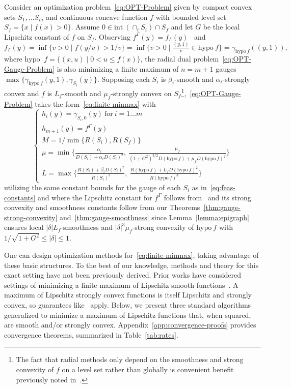 \documentclass[sn-mathphys,Numbered]{sn-jnl}%
\newcommand{\hypo}{\text{hypo }}
\begin{document}
Consider an optimization problem~\eqref{eq:OPT-Problem} given by compact convex sets $S_1,\dots S_m$ and continuous concave function $f$ with bounded level set $S_f = \{x \mid f(x)>0\}$. Assume $0\in \mathrm{int\ } (\cap_{i} S_i)\cap S_f$ and let $G$ be the local Lipschitz constant of $f$ on $S_f$. Observing $f^{\Gamma}(y)=f_{\Gamma}(y)$~\cite[Proposition 11]{grimmer2023radial1} and 
$f_{\Gamma}(y) =\inf\{v>0 \mid f(y/v)>1/v\}= \inf\{v>0 \mid \frac{(y,1)}{v}\in \mathrm{hypo\ }f\}=\gamma_{\mathrm{hypo\ }f}((y,1)),
$
where $\mathrm{\hypo\ }f = \{(x,u) \mid 0 < u\leq f(x)\}$, the radial dual problem~\eqref{eq:OPT-Gauge-Problem} is also minimizing a finite maximum of $n=m+1$ gauges $\max\{\gamma_{\mathrm{hypo\ }f}(y,1),\gamma_{S_i}(y)\}$. Supposing each $S_i$ is $\beta_i$-smooth and $\alpha_i$-strongly convex and $f$ is $L_f$-smooth and $\mu_f$-strongly convex on $S_f$\footnote{The fact that radial methods only depend on the smoothness and strong convexity of $f$ on a level set rather than globally is convenient benefit previously noted in~\cite{grimmer2023radial2}.},~\eqref{eq:OPT-Gauge-Problem} takes the form~\eqref{eq:finite-minmax} with
\begin{equation} \label{eq:OPT-constants}
    \begin{cases} 
        h_i(y) = \gamma_{S_{i},0}(y) \mathrm{\ for\ }i=1\dots m\\
        h_{m+1}(y) = f^\Gamma(y)\\
        M = 1/\min\{R(S_i), R(S_f)\}\\
        \mu = \min\{\frac{\alpha_i}{D(S_i)+\alpha_i D(S_i)^2},\ \frac{\mu_f}{(1+G^2)^{3/2}D(\mathrm{hypo\ }f)+\mu_f D(\mathrm{hypo\ }f)^2}\}\\
        L = \max\{\frac{R(S_i)+\beta_i D(S_i)^2}{R(S_i)^3},\ \frac{R(\mathrm{hypo\ }f)+L_f D(\mathrm{hypo\ }f)^2}{R(\mathrm{hypo\ }f)^3}\}
        \end{cases}
\end{equation}
utilizing the same constant bounds for the gauge of each $S_i$ as in~\eqref{eq:feas-constants} and where the Lipschitz constant for $f^\Gamma$ follows from~\cite[Proposition 1]{grimmer2023radial2} and its strong convexity and smoothness constants follow from our Theorems~\ref{thm:gauge-strong-convexity} and~\ref{thm:gauge-smoothness} since Lemma~\ref{lemma:epigraph} ensures local $|\delta| L_f$-smoothness and $|\delta|^3\mu_f$-strong convexity of $\mathrm{hypo\ } f$ with $1/\sqrt{1+G^2}\leq |\delta| \leq 1$.

One can design optimization methods for~\eqref{eq:finite-minmax}, taking advantage of these basic structures.
To the best of our knowledge, methods and theory for this exact setting have not been previously derived. Prior works have considered settings of minimizing a finite maximum of Lipschitz smooth functions~\cite{Nesterov2005,Beck2012,Nemirovski2004,dima2019}. A maximum of Lipschitz strongly convex functions is itself Lipschitz and strongly convex, so guarantees like~\cite{lacoste2012simpler} apply. Below, we present three standard algorithms generalized to minimize a maximum of Lipschitz functions that, when squared, are smooth and/or strongly convex. Appendix~\ref{app:convergence-proofs} provides convergence theorems, summarized in Table~\ref{tab:rates}. 
\end{document}
